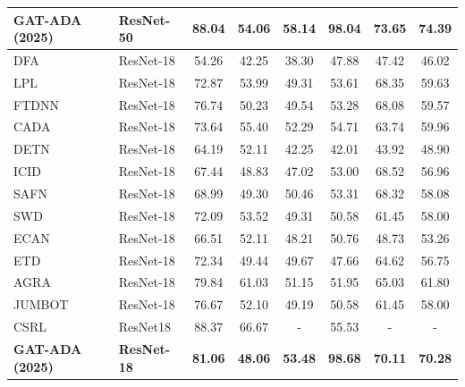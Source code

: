 \documentclass[11pt]{article}
\begin{document}
\begin{table}[htbp]
{\begin{tabular}{@{}l l c c c c c c@{}}
\midrule
\textbf{{GAT-ADA}} \textbf{({2025})} & \textbf{{ResNet-50}} & \textbf{{88.04}} & \textbf{{54.06}} & \textbf{{58.14}} &\textbf{{98.04}} & \textbf{{73.65}} & \textbf{{74.39}} \\
\midrule
DFA ~   & ResNet-18 & 54.26 & 42.25 & 38.30 & 47.88 & 47.42 & 46.02 \\
LPL ~  & ResNet-18 & 72.87 & 53.99 & 49.31 & 53.61 & 68.35 & 59.63 \\
FTDNN ~   & ResNet-18 & 76.74 & 50.23 & 49.54 & 53.28 & 68.08 & 59.57 \\
CADA ~   & ResNet-18 & 73.64 & 55.40 & 52.29 & 54.71 & 63.74 & 59.96 \\
DETN ~   & ResNet-18 & 64.19 & 52.11 & 42.25 & 42.01 & 43.92 & 48.90 \\
ICID ~  & ResNet-18 & 67.44 & 48.83 & 47.02 & 53.00 & 68.52 & 56.96 \\
SAFN ~   & ResNet-18 & 68.99 & 49.30 & 50.46 & 53.31 & 68.32 & 58.08 \\
SWD ~  & ResNet-18 & 72.09 & 53.52 & 49.31 & 50.58 & 61.45 & 58.00 \\
ECAN ~   & ResNet-18 & 66.51 & 52.11 & 48.21 & 50.76 & 48.73 & 53.26 \\
ETD ~   & ResNet-18 & 72.34 & 49.44 & 49.67 & 47.66 & 64.62 & 56.75 \\
AGRA ~   & ResNet-18 & 79.84 & 61.03 & 51.15 & 51.95 & 65.03 & 61.80 \\
JUMBOT ~   & ResNet-18 & 76.67 & 52.10 & 49.19 & 50.58 & 61.45 & 58.00 \\
CSRL ~   & ResNet18 & 88.37 & 66.67 & - & 55.53 & - & - \\

\midrule
\textbf{{GAT-ADA}}\textbf{ ({2025})}  & \textbf{{ResNet-18}} & \textbf{{81.06}} & \textbf{{48.06}} & \textbf{{53.48}} & \textbf{{98.68}} & \textbf{{70.11}} & \textbf{{70.28}} \\
\midrule
\end{tabular}
}
\end{table}
\end{document}
